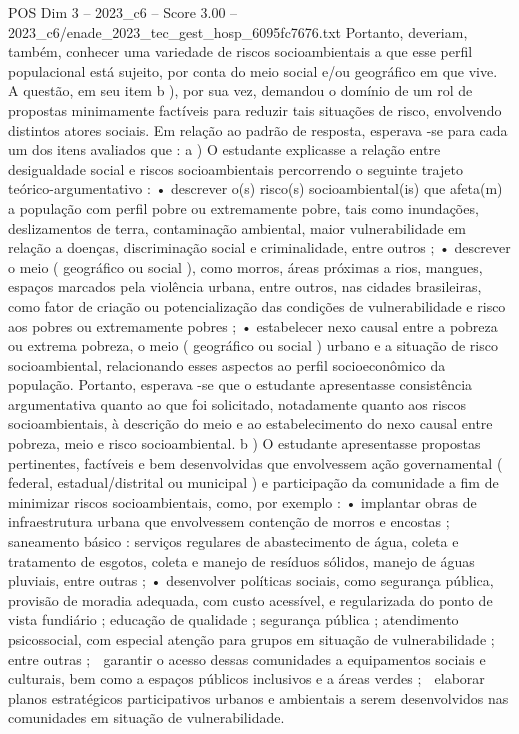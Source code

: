 \begin{textsample}{POS Dim 3 – 2023\_c6 – Score 3.00 – 2023\_c6/enade\_2023\_tec\_gest\_hosp\_6095fc7676.txt}
Portanto, deveriam, também, conhecer uma variedade de riscos socioambientais a que esse perfil populacional está sujeito, por conta do meio social e/ou geográfico em que vive.
A questão, em seu item b ), por sua vez, demandou o domínio de um rol de propostas minimamente factíveis para reduzir tais situações de risco, envolvendo distintos atores sociais.
Em relação ao padrão de resposta, esperava -se para cada um dos itens avaliados que : a ) O estudante explicasse a relação entre desigualdade social e riscos socioambientais percorrendo o seguinte trajeto teórico-argumentativo : • descrever o(s) risco(s) socioambiental(is) que afeta(m) a população com perfil pobre ou extremamente pobre, tais como inundações, deslizamentos de terra, contaminação ambiental, maior vulnerabilidade em relação a doenças, discriminação social e criminalidade, entre outros ; • descrever o meio ( geográfico ou social ), como morros, áreas próximas a rios, mangues, espaços marcados pela violência urbana, entre outros, nas cidades brasileiras, como fator de criação ou potencialização das condições de vulnerabilidade e risco aos pobres ou extremamente pobres ; • estabelecer nexo causal entre a pobreza ou extrema pobreza, o meio ( geográfico ou social ) urbano e a situação de risco socioambiental, relacionando esses aspectos ao perfil socioeconômico da população.
Portanto, esperava -se que o estudante apresentasse consistência argumentativa quanto ao que foi solicitado, notadamente quanto aos riscos socioambientais, à descrição do meio e ao estabelecimento do nexo causal entre pobreza, meio e risco socioambiental. b ) O estudante apresentasse propostas pertinentes, factíveis e bem desenvolvidas que envolvessem ação governamental ( federal, estadual/distrital ou municipal ) e participação da comunidade a fim de minimizar riscos socioambientais, como, por exemplo : • implantar obras de infraestrutura urbana que envolvessem contenção de morros e encostas ; saneamento básico : serviços regulares de abastecimento de água, coleta e tratamento de esgotos, coleta e manejo de resíduos sólidos, manejo de águas pluviais, entre outras ; • desenvolver políticas sociais, como segurança pública, provisão de moradia adequada, com custo acessível, e regularizada do ponto de vista fundiário ; educação de qualidade ; segurança pública ; atendimento psicossocial, com especial atenção para grupos em situação de vulnerabilidade ; entre outras ;  garantir o acesso dessas comunidades a equipamentos sociais e culturais, bem como a espaços públicos inclusivos e a áreas verdes ;  elaborar planos estratégicos participativos urbanos e ambientais a serem desenvolvidos nas comunidades em situação de vulnerabilidade.

\end{textsample}

